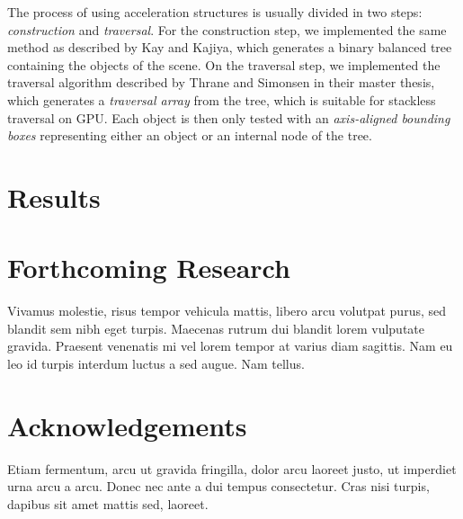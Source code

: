 \documentclass[a0,portrait]{a0poster}
\begin{document}
\begin{multicols}{2}
The process of using acceleration structures is usually divided in two
steps: \emph{construction} and \emph{traversal}. For the construction
step, we implemented the same method as described by Kay and
Kajiya\cite{kay1986ray}, which generates a binary balanced tree
containing the objects of the scene. On the traversal step, we
implemented the traversal algorithm described by Thrane and Simonsen
in their master thesis\cite{Thrane}, which generates a \emph{traversal
  array} from the tree, which is suitable for stackless traversal on
GPU. Each object is then only tested with an \emph{axis-aligned
  bounding boxes} representing either an object or an internal node of
the tree.


\section*{Results}




\section*{Forthcoming Research}

Vivamus molestie, risus tempor vehicula mattis, libero arcu volutpat purus, sed blandit sem nibh eget turpis. Maecenas rutrum dui blandit lorem vulputate gravida. Praesent venenatis mi vel lorem tempor at varius diam sagittis. Nam eu leo id turpis interdum luctus a sed augue. Nam tellus.




\section*{Acknowledgements}

Etiam fermentum, arcu ut gravida fringilla, dolor arcu laoreet justo, ut imperdiet urna arcu a arcu. Donec nec ante a dui tempus consectetur. Cras nisi turpis, dapibus sit amet mattis sed, laoreet.


\end{multicols}
\end{document}
